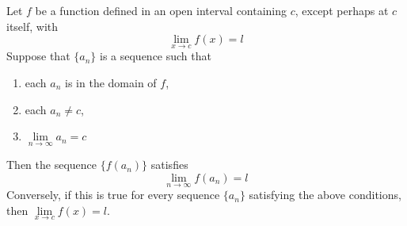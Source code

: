\documentclass[12pt, a4paper, oneside, openright, titlepage]{book}
\begin{document}
\begin{thm}
    Let $f$ be a function defined in an open interval containing $c$, except perhaps at $c$ itself, with \begin{equation*}
        \lim\limits_{x\rightarrow c}f(x) = l
    \end{equation*}
    Suppose that $\{a_n\}$ is a sequence such that \begin{enumerate}
        \item each $a_n$ is in the domain of $f$,
        \item each $a_n \neq c$,
        \item $\lim\limits_{n\rightarrow \infty}a_n = c$
    \end{enumerate}
    Then the sequence $\{f(a_n)\}$ satisfies \begin{equation*}
        \lim\limits_{n\rightarrow \infty}f(a_n) = l
    \end{equation*}
    Conversely, if this is true for every sequence $\{a_n\}$ satisfying the above conditions, then $\lim\limits_{x\rightarrow c}f(x) = l$.
\end{thm}
\end{document}
